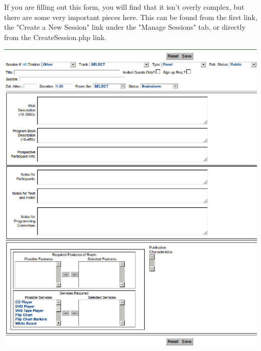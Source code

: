 \documentclass[captions=tablesignature]{scrartcl}
\begin{document}
If you are filling out this form, you will find that it isn't
overly complex, but there are some very important pieces here.
This can be found from the first link, the "Create a New Session"
link under the "Manage Sessions" tab, or directly from the
CreateSession.php link.

\includegraphics[width=0.98\textwidth]{./Images/Add_New_Session.png}
\end{document}
